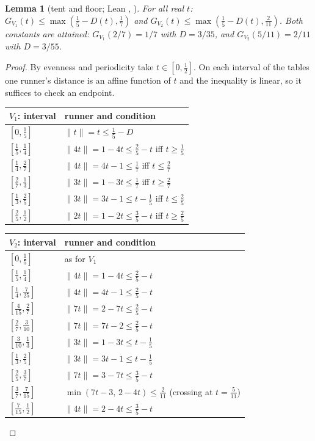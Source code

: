 \documentclass[11pt]{article}
\newtheorem{lemma}[theorem]{Lemma}
\theoremstyle{remark}
\newcommand{\dist}[1]{\lVert #1\rVert}
\begin{document}
\begin{lemma}[tent and floor; Lean , ]\label{lem:H}
For all real $t$: $G_{V_1}(t)\le\max(\tfrac15-D(t),\tfrac17)$ and $G_{V_2}(t)\le\max(\tfrac15-D(t),\tfrac2{11})$. Both constants are attained: $G_{V_1}(2/7)=1/7$ with $D=3/35$, and $G_{V_2}(5/11)=2/11$ with $D=3/55$.
\end{lemma}
\begin{proof}
By evenness and periodicity take $t\in[0,\tfrac12]$. On each interval of the tables one runner's distance is an affine function of $t$ and the inequality is linear, so it suffices to check an endpoint.
\begin{center}\small
\begin{tabular}{ll}\toprule
$V_1$: interval & runner and condition\\\midrule
$[0,\frac15]$ & $\dist t=t\le\frac15-D$\\
$[\frac15,\frac14]$ & $\dist{4t}=1-4t\le\frac25-t$ iff $t\ge\frac15$\\
$[\frac14,\frac27]$ & $\dist{4t}=4t-1\le\frac17$ iff $t\le\frac27$\\
$[\frac27,\frac13]$ & $\dist{3t}=1-3t\le\frac17$ iff $t\ge\frac27$\\
$[\frac13,\frac25]$ & $\dist{3t}=3t-1\le t-\frac15$ iff $t\le\frac25$\\
$[\frac25,\frac12]$ & $\dist{2t}=1-2t\le\frac35-t$ iff $t\ge\frac25$\\\bottomrule
\end{tabular}
\qquad
\begin{tabular}{ll}\toprule
$V_2$: interval & runner and condition\\\midrule
$[0,\frac15]$ & as for $V_1$\\
$[\frac15,\frac14]$ & $\dist{4t}=1-4t\le\frac25-t$\\
$[\frac14,\frac7{25}]$ & $\dist{4t}=4t-1\le\frac25-t$\\
$[\frac4{15},\frac27]$ & $\dist{7t}=2-7t\le\frac25-t$\\
$[\frac27,\frac3{10}]$ & $\dist{7t}=7t-2\le\frac25-t$\\
$[\frac3{10},\frac13]$ & $\dist{3t}=1-3t\le t-\frac15$\\
$[\frac13,\frac25]$ & $\dist{3t}=3t-1\le t-\frac15$\\
$[\frac25,\frac37]$ & $\dist{7t}=3-7t\le\frac35-t$\\
$[\frac37,\frac7{15}]$ & $\min(7t-3,\,2-4t)\le\frac2{11}$ (crossing at $t=\frac5{11}$)\\
$[\frac7{15},\frac12]$ & $\dist{4t}=2-4t\le\frac35-t$\\\bottomrule
\end{tabular}
\end{center}
\end{proof}
\end{document}
